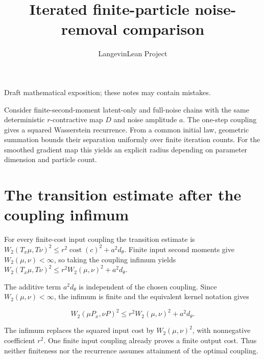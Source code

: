 \documentclass[11pt,a4paper]{article}
\title{\texorpdfstring{Iterated finite-particle noise-removal comparison}{Iterated finite-particle noise-removal comparison}}
\author{LangevinLean Project}
\date{}
\begin{document}
\maketitle
Draft mathematical exposition; these notes may contain mistakes.


Consider finite-second-moment latent-only and full-noise chains with the same deterministic \(r\)-contractive map \(D\) and noise amplitude \(a\). The one-step coupling gives a squared Wasserstein recurrence. From a common initial law, geometric summation bounds their separation uniformly over finite iteration counts. For the smoothed gradient map this yields an explicit radius depending on parameter dimension and particle count.


\section{\texorpdfstring{The transition estimate after the coupling infimum}{The transition estimate after the coupling infimum}}


For every finite-cost input coupling the transition estimate is \(W_2(T_x\mu,T\nu)^2\le r^2\operatorname{cost}(c)^2+a^2d_\theta\). Finite input second moments give \(W_2(\mu,\nu)<\infty\), so taking the coupling infimum yields \(W_2(T_x\mu,T\nu)^2\le r^2W_2(\mu,\nu)^2+a^2d_\theta\).



The additive term \(a^2d_\theta\) is independent of the chosen coupling. Since \(W_2(\mu,\nu)<\infty\), the infimum is finite and the equivalent kernel notation gives

\[W_2(\mu P_x,\nu P)^2\le r^2W_2(\mu,\nu)^2+a^2d_\theta.\]

The infimum replaces the squared input cost by \(W_2(\mu,\nu)^2\), with nonnegative coefficient \(r^2\). One finite input coupling already proves a finite output cost. Thus neither finiteness nor the recurrence assumes attainment of the optimal coupling.
\end{document}
